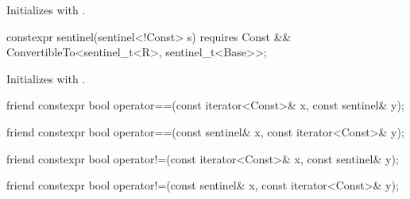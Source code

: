 \begin{itemdescr}
\pnum
\effects Initializes  with .
\end{itemdescr}

\begin{itemdecl}
constexpr sentinel(sentinel<!Const> s) requires Const &&
  ConvertibleTo<sentinel_t<R>, sentinel_t<Base>>;
\end{itemdecl}

\begin{itemdescr}
\pnum
\effects Initializes  with .
\end{itemdescr}

\begin{itemdecl}
friend constexpr bool operator==(const iterator<Const>& x, const sentinel& y);
\end{itemdecl}

\begin{itemdescr}
\pnum
\oldtxt{\returns} 
\end{itemdescr}

\begin{itemdecl}
friend constexpr bool operator==(const sentinel& x, const iterator<Const>& y);
\end{itemdecl}

\begin{itemdescr}
\pnum
\oldtxt{\returns} 
\end{itemdescr}

\begin{itemdecl}
friend constexpr bool operator!=(const iterator<Const>& x, const sentinel& y);
\end{itemdecl}

\begin{itemdescr}
\pnum
\oldtxt{\returns} 
\end{itemdescr}

\begin{itemdecl}
friend constexpr bool operator!=(const sentinel& x, const iterator<Const>& y);
\end{itemdecl}

